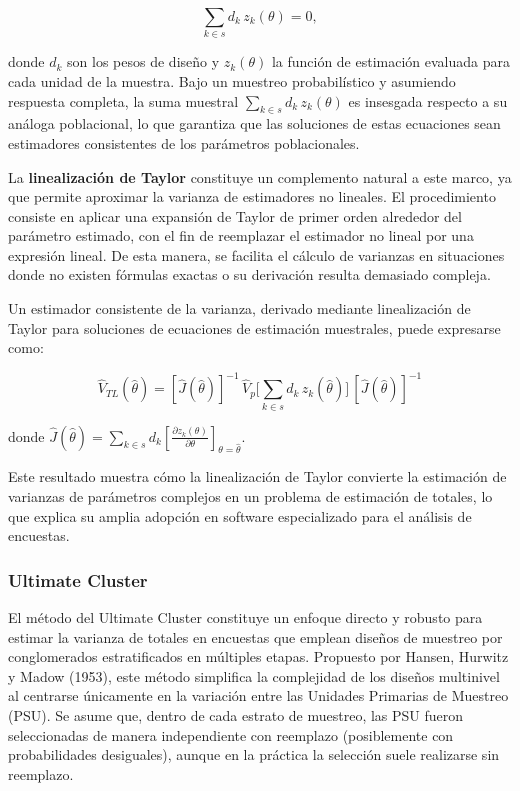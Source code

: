 \documentclass[
  spanish,
  12pt,
]{book}
\begin{document}
\[
\sum_{k\in s} d_k\, z_k(\theta)=0,
\]

donde \(d_k\) son los pesos de diseño y \(z_k(\theta)\) la función de estimación evaluada para cada unidad de la muestra. Bajo un muestreo probabilístico y asumiendo respuesta completa, la suma muestral \(\sum_{k\in s} d_k\, z_k(\theta)\) es insesgada respecto a su análoga poblacional, lo que garantiza que las soluciones de estas ecuaciones sean estimadores consistentes de los parámetros poblacionales.

La \textbf{linealización de Taylor} constituye un complemento natural a este marco, ya que permite aproximar la varianza de estimadores no lineales. El procedimiento consiste en aplicar una expansión de Taylor de primer orden alrededor del parámetro estimado, con el fin de reemplazar el estimador no lineal por una expresión lineal. De esta manera, se facilita el cálculo de varianzas en situaciones donde no existen fórmulas exactas o su derivación resulta demasiado compleja.

Un estimador consistente de la varianza, derivado mediante linealización de Taylor para soluciones de ecuaciones de estimación muestrales, puede expresarse como:

\[
\hat{V}_{TL}(\hat{\theta}) = [\hat{J}(\hat{\theta})]^{-1} \, \hat{V}_p \Bigg[\sum_{k\in s} d_k\, z_k(\hat{\theta})\Bigg] \, [\hat{J}(\hat{\theta})]^{-1}
\]

donde \(\hat{J}(\hat{\theta}) = \sum_{k\in s} d_k \left[ \frac{\partial z_k(\theta)}{\partial \theta} \right]_{\theta=\hat{\theta}}\).

Este resultado muestra cómo la linealización de Taylor convierte la estimación de varianzas de parámetros complejos en un problema de estimación de totales, lo que explica su amplia adopción en software especializado para el análisis de encuestas.

\subsubsection*{Ultimate Cluster}\label{ultimate-cluster}

El método del Ultimate Cluster constituye un enfoque directo y robusto para estimar la varianza de totales en encuestas que emplean diseños de muestreo por conglomerados estratificados en múltiples etapas. Propuesto por Hansen, Hurwitz y Madow (1953), este método simplifica la complejidad de los diseños multinivel al centrarse únicamente en la variación entre las Unidades Primarias de Muestreo (PSU). Se asume que, dentro de cada estrato de muestreo, las PSU fueron seleccionadas de manera independiente con reemplazo (posiblemente con probabilidades desiguales), aunque en la práctica la selección suele realizarse sin reemplazo.
\end{document}

